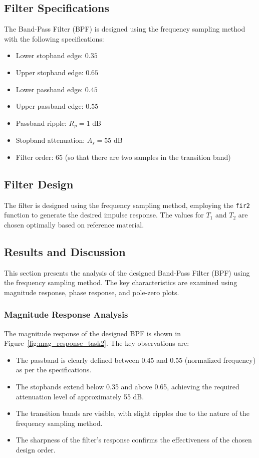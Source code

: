 \documentclass[a4paper,12pt]{article}
\begin{document}
\subsection{Filter Specifications}
The Band-Pass Filter (BPF) is designed using the frequency sampling method with the following specifications:
\begin{itemize}
    \item Lower stopband edge: \( 0.35 \)
    \item Upper stopband edge: \( 0.65 \)
    \item Lower passband edge: \( 0.45 \)
    \item Upper passband edge: \( 0.55 \)
    \item Passband ripple: \( R_p = 1 \) dB
    \item Stopband attenuation: \( A_s = 55 \) dB
    \item Filter order: \( 65 \) (so that there are two samples in the transition band)
\end{itemize}

\subsection{Filter Design}
The filter is designed using the frequency sampling method, employing the \texttt{fir2} function to generate the desired impulse response. The values for \( T_1 \) and \( T_2 \) are chosen optimally based on reference material.




\subsection{Results and Discussion}

This section presents the analysis of the designed Band-Pass Filter (BPF) using the frequency sampling method. The key characteristics are examined using magnitude response, phase response, and pole-zero plots.

\subsubsection{Magnitude Response Analysis}
The magnitude response of the designed BPF is shown in Figure~\ref{fig:mag_response_task2}. The key observations are:
\begin{itemize}
    \item The passband is clearly defined between 0.45 and 0.55 (normalized frequency) as per the specifications.
    \item The stopbands extend below 0.35 and above 0.65, achieving the required attenuation level of approximately 55 dB.
    \item The transition bands are visible, with slight ripples due to the nature of the frequency sampling method.
    \item The sharpness of the filter’s response confirms the effectiveness of the chosen design order.
\end{itemize}
\end{document}
